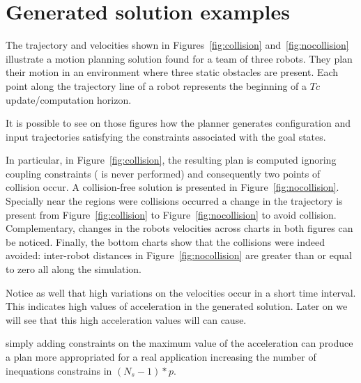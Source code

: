 \section{Generated solution examples}


The trajectory and velocities shown in Figures~\ref{fig:collision} and~\ref{fig:nocollision}
illustrate a motion planning solution found for a team of three robots.
They plan their motion in an environment where three static obstacles are present.
Each point along the trajectory line of a robot represents the beginning
of a $Tc$ update/computation horizon.

It is possible to see on those figures how the planner generates configuration and 
input trajectories satisfying the constraints associated with the goal states.

In particular, in Figure~\ref{fig:collision}, the resulting plan is computed ignoring 
coupling constraints ( is never performed) and consequently two points of collision occur.
A collision-free solution is presented in Figure~\ref{fig:nocollision}.
Specially near the regions were collisions occurred a change in the trajectory is present from Figure~\ref{fig:collision} to Figure~\ref{fig:nocollision} to avoid collision. 
Complementary, changes 
in the robots velocities across charts in both figures can be noticed. Finally, the 
bottom charts show that the collisions were indeed avoided: inter-robot distances in 
Figure~\ref{fig:nocollision} are greater than or equal to zero all along the 
simulation.

Notice as well that high variations on the velocities occur in a short time interval. This indicates high values of acceleration in the generated solution. %
Later on we will see that this high acceleration values will can cause.

 simply adding constraints on the maximum value of the acceleration can produce a plan more appropriated for a real application increasing the number of inequations constrains in $(N_s-1)*p$.


